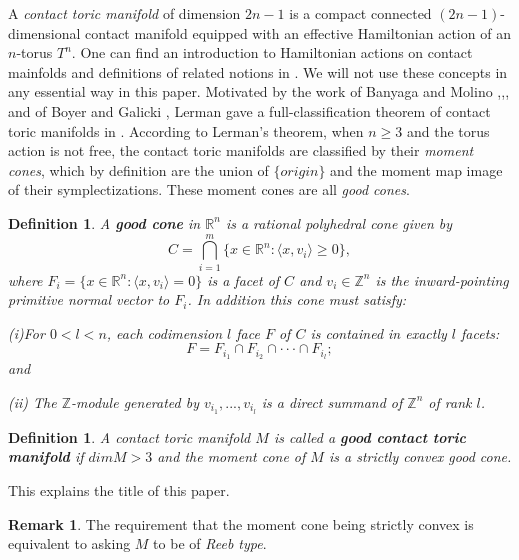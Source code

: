 \documentclass[12pt]{amsart}
\def\Z {{\mathbb{Z}}}
\def\R {{\mathbb{R}}}
\def\cdots {{\cdot\cdot\cdot}}
\newtheorem{definition}[theorem]{Definition}
\theoremstyle{definition}
\newtheorem{remark}[theorem]{Remark}
\numberwithin{equation}{section}
\begin{document}
 A {\em contact toric manifold} of dimension
$2n-1$ is a compact connected $(2n-1)$-dimensional contact manifold
equipped with an effective Hamiltonian action of an $n$-torus $T^n$.
One can find an introduction to Hamiltonian actions on contact
mainfolds and definitions of related notions in \cite{L:contact
toric}. We will not use these concepts in any essential way in this
paper. Motivated by the work of Banyaga and Molino
\cite{BnM1},\cite{BnM2},\cite{Banyaga}, and of Boyer and Galicki
\cite{BoyG}, Lerman gave a full-classification theorem of contact
toric manifolds in \cite{L:contact toric}. According to Lerman's
theorem, when $n\geq 3$ and the torus action is not free, the
contact toric manifolds are classified by their {\it moment cones},
which by definition are the union of $\{origin\}$ and the moment map
image of their symplectizations. These moment cones are all {\it
good cones}.
\begin{definition}\label{def:good cone}
 A {\bf good cone} in $\R^n$ is a rational polyhedral cone given by
\begin{equation}
C= \bigcap_{i=1}^{m}\{x\in \R^n: \langle x, v_{i}\rangle \geq 0\},
\end{equation}
where $F_{i}=\{x\in \R^n: \langle x,v_{i} \rangle=0\}$ is a facet of
$C$ and $v_{i}\in \Z^n$ is the inward-pointing primitive normal
vector to $F_{i}$. In addition this cone must satisfy:

(i)For $0<l<n$, each codimension $l$ face $F$ of $C$ is contained in
exactly $l$ facets:
\begin{equation*}
F=F_{i_{1}}\cap F_{i_{2}}\cap\cdots\cap F_{i_{l}};
\end{equation*}
and

(ii) The $\Z$-module generated by $v_{i_{1}},...,v_{i_{l}}$ is a
direct summand of $\Z^n$ of rank $l$.
\end{definition}


\begin{definition}\label{def:good contact toric manifolds}
A contact toric manifold $M$ is called a {\bf good contact toric
manifold} if $dim M > 3$ and the moment cone of $M$ is a strictly
convex good cone.
\end{definition}

This explains the title of this paper.

\begin{remark}
The requirement that the moment cone being strictly convex is
equivalent to asking $M$ to be of {\em Reeb type}.
\end{remark}
\end{document}
